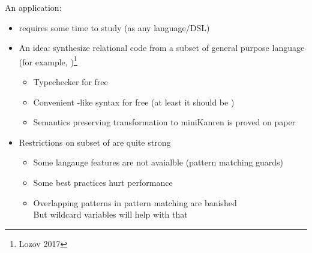 \documentclass[aspectratio=169
  , xcolor={svgnames}
  , hyperref=
      { colorlinks
      , urlcolor=DarkBlue
      }
  , russian  %
  ]{beamer}
\begin{document}
\begin{frame}{An application: \noCanren}
\begin{itemize}
\item [\faBad] \miniKanren{} requires some time to study (as any language/DSL)
\item An idea: synthesize relational code from a subset of general purpose language (for example, \OCaml{})\footnote{Lozov 2017}
\begin{itemize}
\item[\faGood] Typechecker for free
\item[\faGood] Convenient \OCaml{}-like syntax  for free (at least it should be  )
\item Semantics preserving transformation to miniKanren is proved on paper
\end{itemize}
\item  Restrictions on subset of \OCaml{} are quite strong
\begin{itemize}
\item Some langauge features are not avaialble (pattern matching guards)
\item Some \OCaml{} best practices hurt performance
\item Overlapping patterns in pattern matching are banished\\
But wildcard variables will help with that \faGood

\end{itemize}
\end{itemize}
\end{frame}

\end{document}
